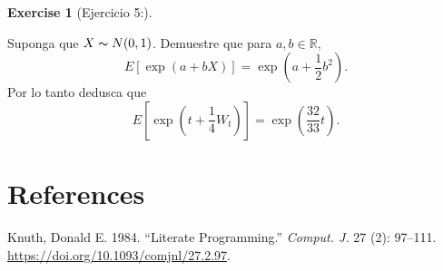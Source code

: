 \documentclass[
  letterpaper,
  DIV=11,
  numbers=noendperiod]{scrreprt}
\newlength{\cslhangindent}
\newlength{\cslentryspacingunit} %
\newenvironment{CSLReferences}[2] %
 {%
  \setlength{\parindent}{0pt}
  \ifodd #1
  \let\oldpar\par
  \def\par{\hangindent=\cslhangindent\oldpar}
  \fi
  \setlength{\parskip}{#2\cslentryspacingunit}
 }%
 {}
\theoremstyle{definition}
\newtheorem{exercise}{Exercise}[chapter]
\theoremstyle{plain}
\theoremstyle{remark}
\begin{document}
\begin{exercise}[Ejercicio 5:]\protect\hypertarget{exr-5}{}\label{exr-5}

Suponga que \(X\thicksim N(0,1)\). Demuestre que para
\(a, b\in\mathbb{R}\), \[
E[\exp(a+bX)]=\exp\left(a+\frac{1}{2}b^{2}\right).
\] Por lo tanto dedusca que \[
E[\exp(t+\frac{1}{4}W_{t})]=\exp\left(\frac{32}{33}t\right).
\]

\end{exercise}


\hypertarget{references}{%
\chapter*{References}\label{references}}


\hypertarget{refs}{}
\begin{CSLReferences}{1}{0}
\leavevmode{}%
Knuth, Donald E. 1984. {``Literate Programming.''} \emph{Comput. J.} 27
(2): 97--111. \url{https://doi.org/10.1093/comjnl/27.2.97}.

\end{CSLReferences}
\end{document}
